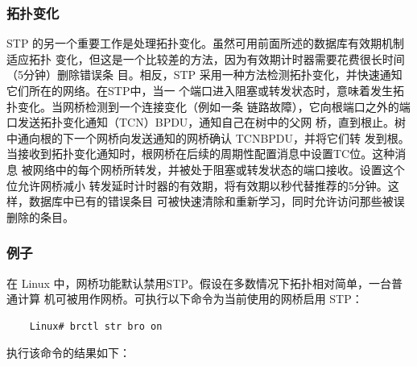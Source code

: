 \subsubsection{拓扑变化}

STP 的另一个重要工作是处理拓扑变化。虽然可用前面所述的数据库有效期机制适应拓扑
变化，但这是一个比较差的方法，因为有效期计时器需要花费很长时间（5分钟）删除错误条
目。相反，STP 采用一种方法检测拓扑变化，并快速通知它们所在的网络。在STP中，当一
个端口进入阻塞或转发状态时，意味着发生拓扑变化。当网桥检测到一个连接变化（例如一条
链路故障），它向根端口之外的端口发送拓扑变化通知（TCN）BPDU，通知自己在树中的父网
桥，直到根止。树中通向根的下一个网桥向发送通知的网桥确认 TCNBPDU，并将它们转
发到根。当接收到拓扑变化通知时，根网桥在后续的周期性配置消息中设置TC位。这种消息
被网络中的每个网桥所转发，并被处于阻塞或转发状态的端口接收。设置这个位允许网桥减小
转发延时计时器的有效期，将有效期以秒代替推荐的5分钟。这样，数据库中已有的错误条目
可被快速清除和重新学习，同时允许访问那些被误删除的条目。

\subsubsection{例子}

在 Linux 中，网桥功能默认禁用STP。假设在多数情况下拓扑相对简单，一台普通计算
机可被用作网桥。可执行以下命令为当前使用的网桥启用 STP：

\begin{verbatim}
    Linux# brctl str bro on
\end{verbatim}

执行该命令的结果如下：

